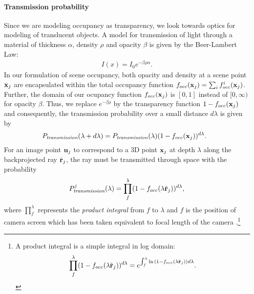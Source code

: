 \paragraph{Transmission probability}
\label{sec:ptransmission}
Since we are modeling occupancy as transparency, we look towards optics for modeling of translucent objects. A model for transmission of light through a material of thickness $\alpha$, density $\rho$ and opacity $\beta$ is given by the Beer-Lambert Law:
\begin{align}
I(x) = I_0 e^{-\beta\rho\alpha}.
\end{align}
%
In our formulation of scene occupancy, both opacity and density at a scene point $\mathbf{x}_j$ are encapsulated within the total occupancy function $f_{occ}(\mathbf{x}_j) = \sum_i f^i_{occ}(\mathbf{x}_j)$. Further, the domain of our ocupancy function $f_{occ}(\mathbf{x}_j)$ is $[0, 1]$ instead of $[0, \infty)$ for opacity $\beta$. Thus, we replace $e^{-\beta\rho}$ by the transparency function $1 - f_{occ}(\mathbf{x}_j)$ and consequently, the transmission probability over a small distance $d\lambda$ is given by
%
\begin{align}
  \!\!\!\! P_{\textit{transmission}}(\lambda + d\lambda) = P_{\textit{transmission}}(\lambda) (1-f_{occ}(\mathbf{x}_j))^{d\lambda}.
\end{align}
%
For an image point $\mathbf{u}_j$ to correspond to a 3D point $\mathbf{x}_j$ at depth $\lambda$ along the backprojected ray $\hat{\mathbf{r}}_j$, the ray must be transmitted through space with the probability
\begin{align}
P^j_{\textit{transmission}}(\lambda) = \prod_{f}^{\lambda} (1 - f_{occ}(\lambda \hat{\mathbf{r}}_j))^{d\lambda},
\label{eq:ptrans-integral}
\end{align}
where $\displaystyle\prod_{f}^{\lambda}$ represents the \emph{product integral} from $f$ to $\lambda$ and $f$ is the position of camera screen which has been taken equivalent to focal length of the camera .\footnote{A product integral is a simple integral in log domain: 
\vspace{-0.2cm}
\begin{equation}
\prod_{f}^{\lambda} (1 - f_{occ}(\lambda \hat{\mathbf{r}}_j))^{d\lambda} = e^{\int_{f}^{\lambda} \ln{(1 - f_{occ}(\lambda \hat{\mathbf{r}}_j))}{d\lambda}}. \nonumber
\end{equation}
}

